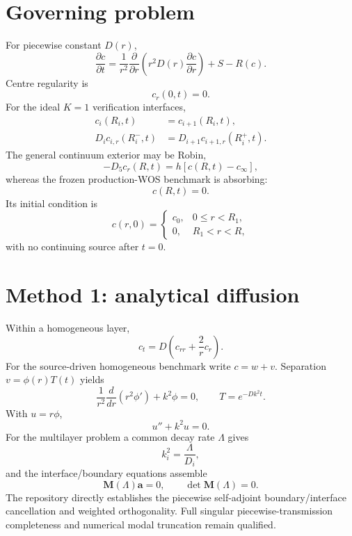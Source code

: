 \documentclass[11pt]{article}
\begin{document}
\section{Governing problem}
For piecewise constant $D(r)$,
\begin{equation}
\frac{\partial c}{\partial t}
=\frac{1}{r^2}\frac{\partial}{\partial r}
\left(r^2D(r)\frac{\partial c}{\partial r}\right)+S-R(c).
\label{eq:pde}
\end{equation}
Centre regularity is
\begin{equation}
c_r(0,t)=0.
\end{equation}
For the ideal $K=1$ verification interfaces,
\begin{align}
c_i(R_i,t)&=c_{i+1}(R_i,t),\\
D_i c_{i,r}(R_i^-,t)&=D_{i+1}c_{i+1,r}(R_i^+,t).
\end{align}
The general continuum exterior may be Robin,
\begin{equation}
-D_5c_r(R,t)=h[c(R,t)-c_\infty],
\end{equation}
whereas the frozen production-WOS benchmark is absorbing:
\begin{equation}
c(R,t)=0.
\end{equation}
Its initial condition is
\begin{equation}
c(r,0)=
\begin{cases}
c_0,&0\le r<R_1,\\
0,&R_1<r<R,
\end{cases}
\end{equation}
with no continuing source after $t=0$.

\section{Method 1: analytical diffusion}
Within a homogeneous layer,
\begin{equation}
c_t=D\left(c_{rr}+\frac{2}{r}c_r\right).
\end{equation}
For the source-driven homogeneous benchmark write $c=w+v$. Separation $v=\phi(r)T(t)$ yields
\begin{equation}
\frac{1}{r^2}\frac{d}{dr}\left(r^2\phi'\right)+k^2\phi=0,
\qquad T=e^{-Dk^2t}.
\end{equation}
With $u=r\phi$,
\begin{equation}
u''+k^2u=0.
\end{equation}
For the multilayer problem a common decay rate $\Lambda$ gives
\begin{equation}
k_i^2=\frac{\Lambda}{D_i},
\end{equation}
and the interface/boundary equations assemble
\begin{equation}
\bm M(\Lambda)\bm a=0,\qquad \det\bm M(\Lambda)=0.
\end{equation}
The repository directly establishes the piecewise self-adjoint boundary/interface cancellation and weighted orthogonality. Full singular piecewise-transmission completeness and numerical modal truncation remain qualified.
\end{document}
